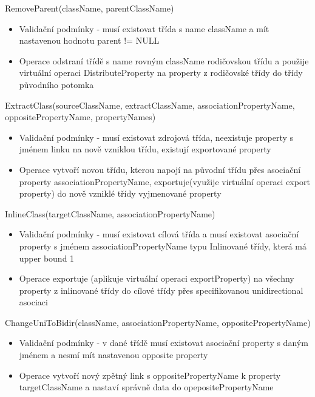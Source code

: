 \documentclass[11pt,twoside,a4paper]{book}
\begin{document}
\begin{list}{Operace :}{}
\begin{itemize}
  \end{itemize}
  \item RemoveParent(className, parentClassName)
  \begin{itemize}
    \item Validační podmínky - musí existovat třída s name className a mít
    nastavenou hodnotu parent != NULL
    \item Operace odstraní třídě s name rovným className rodičovskou třídu a
    použije virtuální operaci DistributeProperty na property z rodičovské třídy
    do třídy původního potomka
  \end{itemize}
  \item ExtractClass(sourceClassName, extractClassName,
  associationPropertyName, oppositePropertyName, propertyNames)
  \begin{itemize}
    \item Validační podmínky - musí existovat zdrojová třída, neexistuje
    property s jménem linku na nově vzniklou třídu, existují exportované property
    \item Operace vytvoří novou třídu, kterou napojí na původní třídu přes
    asociační property associationPropertyName, exportuje(využije virtuální
    operaci export property) do nově vzniklé třídy vyjmenované property
  \end{itemize}
  \item InlineClass(targetClassName, associationPropertyName)
  \begin{itemize}
    \item Validační podmínky - musí existovat cílová třída a
    musí existovat asociační property s jménem associationPropertyName typu
    Inlinované třídy, která má upper bound 1
    \item Operace exportuje (aplikuje virtuální operaci exportProperty)
    na všechny property z inlinované třídy do cílové třídy přes specifikovanou
    unidirectional asociaci
  \end{itemize}
  \item ChangeUniToBidir(className, associationPropertyName, oppositePropertyName)
  \begin{itemize}
    \item Validační podmínky - v dané třídě musí existovat asociační property
    s daným jménem a nesmí mít nastavenou opposite property 
    \item Operace vytvoří nový zpětný link s oppositePropertyName k property
    targetClassName a nastaví správně data do opepositePropertyName
  \end{itemize}

\end{list}
\end{document}
